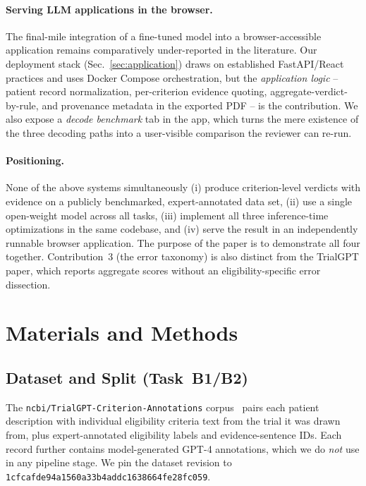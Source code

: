 \documentclass[conference]{IEEEtran}
\newcommand{\code}[1]{\texttt{\small #1}}
\newcommand{\dataset}{\texttt{ncbi/TrialGPT-Criterion-Annotations}}
\begin{document}
\paragraph*{Serving LLM applications in the browser.}
The final-mile integration of a fine-tuned model into a
browser-accessible application remains comparatively under-reported
in the literature. Our deployment stack (Sec.~\ref{sec:application})
draws on established FastAPI/React practices and uses Docker
Compose orchestration, but the \emph{application logic} --
patient record normalization, per-criterion evidence quoting,
aggregate-verdict-by-rule, and provenance metadata in the exported
PDF -- is the contribution. We also expose a
\emph{decode benchmark} tab in the app, which turns the
mere existence of the three decoding paths into a
user-visible comparison the reviewer can re-run.

\paragraph*{Positioning.}
None of the above systems simultaneously (i) produce
criterion-level verdicts with evidence on a
publicly benchmarked, expert-annotated data set, (ii) use a single
open-weight model across all tasks, (iii) implement all three
inference-time optimizations in the same codebase, and (iv) serve the
result in an independently runnable browser application. The purpose
of the paper is to demonstrate all four together. Contribution~3
(the error taxonomy) is also distinct from the TrialGPT paper, which
reports aggregate scores without an eligibility-specific error
dissection.

\section{Materials and Methods}
\label{sec:method}

\subsection{Dataset and Split (Task~B1/B2)}
\label{sec:data}

The \dataset{} corpus~\cite{id2} pairs each patient description with
individual eligibility criteria text from the trial it was drawn
from, plus expert-annotated eligibility labels and evidence-sentence
IDs. Each record further contains model-generated GPT-4 annotations,
which we do \emph{not} use in any pipeline stage. We pin the dataset
revision to \code{1cfcafde94a1560a33b4addc1638664fe28fc059}.
\end{document}
